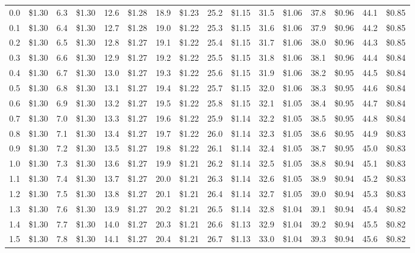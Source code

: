 \documentclass{article}
\begin{document}
\begin{tabular}{|*{8}{rr|}}
0.0 & \$1.30 & 6.3 & \$1.30 & 12.6 & \$1.28 & 18.9 & \$1.23 & 25.2 & \$1.15 & 31.5 & \$1.06 & 37.8 & \$0.96 & 44.1 & \$0.85\\
0.1 & \$1.30 & 6.4 & \$1.30 & 12.7 & \$1.28 & 19.0 & \$1.22 & 25.3 & \$1.15 & 31.6 & \$1.06 & 37.9 & \$0.96 & 44.2 & \$0.85\\
0.2 & \$1.30 & 6.5 & \$1.30 & 12.8 & \$1.27 & 19.1 & \$1.22 & 25.4 & \$1.15 & 31.7 & \$1.06 & 38.0 & \$0.96 & 44.3 & \$0.85\\
0.3 & \$1.30 & 6.6 & \$1.30 & 12.9 & \$1.27 & 19.2 & \$1.22 & 25.5 & \$1.15 & 31.8 & \$1.06 & 38.1 & \$0.96 & 44.4 & \$0.84\\
0.4 & \$1.30 & 6.7 & \$1.30 & 13.0 & \$1.27 & 19.3 & \$1.22 & 25.6 & \$1.15 & 31.9 & \$1.06 & 38.2 & \$0.95 & 44.5 & \$0.84\\
0.5 & \$1.30 & 6.8 & \$1.30 & 13.1 & \$1.27 & 19.4 & \$1.22 & 25.7 & \$1.15 & 32.0 & \$1.06 & 38.3 & \$0.95 & 44.6 & \$0.84\\
0.6 & \$1.30 & 6.9 & \$1.30 & 13.2 & \$1.27 & 19.5 & \$1.22 & 25.8 & \$1.15 & 32.1 & \$1.05 & 38.4 & \$0.95 & 44.7 & \$0.84\\
0.7 & \$1.30 & 7.0 & \$1.30 & 13.3 & \$1.27 & 19.6 & \$1.22 & 25.9 & \$1.14 & 32.2 & \$1.05 & 38.5 & \$0.95 & 44.8 & \$0.84\\
0.8 & \$1.30 & 7.1 & \$1.30 & 13.4 & \$1.27 & 19.7 & \$1.22 & 26.0 & \$1.14 & 32.3 & \$1.05 & 38.6 & \$0.95 & 44.9 & \$0.83\\
0.9 & \$1.30 & 7.2 & \$1.30 & 13.5 & \$1.27 & 19.8 & \$1.22 & 26.1 & \$1.14 & 32.4 & \$1.05 & 38.7 & \$0.95 & 45.0 & \$0.83\\
1.0 & \$1.30 & 7.3 & \$1.30 & 13.6 & \$1.27 & 19.9 & \$1.21 & 26.2 & \$1.14 & 32.5 & \$1.05 & 38.8 & \$0.94 & 45.1 & \$0.83\\
1.1 & \$1.30 & 7.4 & \$1.30 & 13.7 & \$1.27 & 20.0 & \$1.21 & 26.3 & \$1.14 & 32.6 & \$1.05 & 38.9 & \$0.94 & 45.2 & \$0.83\\
1.2 & \$1.30 & 7.5 & \$1.30 & 13.8 & \$1.27 & 20.1 & \$1.21 & 26.4 & \$1.14 & 32.7 & \$1.05 & 39.0 & \$0.94 & 45.3 & \$0.83\\
1.3 & \$1.30 & 7.6 & \$1.30 & 13.9 & \$1.27 & 20.2 & \$1.21 & 26.5 & \$1.14 & 32.8 & \$1.04 & 39.1 & \$0.94 & 45.4 & \$0.82\\
1.4 & \$1.30 & 7.7 & \$1.30 & 14.0 & \$1.27 & 20.3 & \$1.21 & 26.6 & \$1.13 & 32.9 & \$1.04 & 39.2 & \$0.94 & 45.5 & \$0.82\\
1.5 & \$1.30 & 7.8 & \$1.30 & 14.1 & \$1.27 & 20.4 & \$1.21 & 26.7 & \$1.13 & 33.0 & \$1.04 & 39.3 & \$0.94 & 45.6 & \$0.82\\

\end{tabular}
\end{document}

